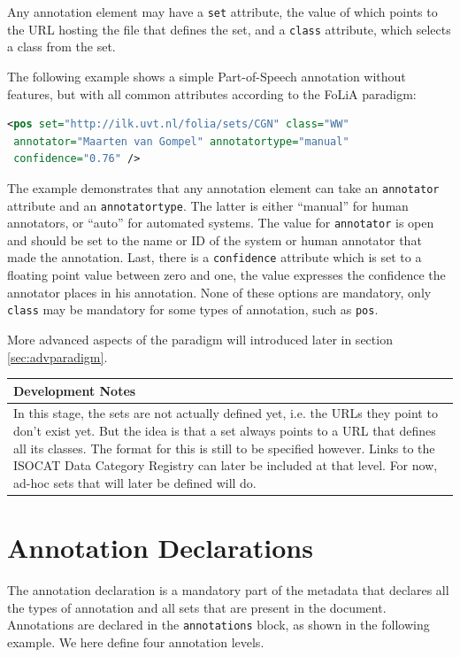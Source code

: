 \documentclass[a4paper,12pt]{report}
\newenvironment{devnotes}
{
\begin{center}
    \begin{tabular}[h!]{|p{0.8\textwidth}|}
    \hline
    {\bf Development Notes}\\\hline}
{   \\\hline
    \end{tabular}
\end{center}}
\begin{document}
Any annotation element may have a \texttt{set} attribute, the value of which points to the URL hosting the file that defines the set, and a \texttt{class} attribute, which selects a class from the set.

The following example shows a simple Part-of-Speech annotation without features, but with all common attributes according to the FoLiA paradigm:

\begin{lstlisting}[language=xml]
<pos set="http://ilk.uvt.nl/folia/sets/CGN" class="WW" 
 annotator="Maarten van Gompel" annotatortype="manual"
 confidence="0.76" />
\end{lstlisting}

The example demonstrates that any annotation element can take an \texttt{annotator} attribute and an \texttt{annotatortype}. The latter is either ``manual'' for human annotators, or ``auto'' for automated systems.  The value for \texttt{annotator} is open and should be set to the name or ID of the system or human annotator that made the annotation. Last, there is a \texttt{confidence} attribute which is set to a floating point value between zero and one, the value expresses the confidence the annotator places in his annotation. None of these options are mandatory, only \texttt{class} may be mandatory for some types of annotation, such as \texttt{pos}.

More advanced aspects of the paradigm will introduced later in section \ref{sec:advparadigm}.

\begin{devnotes}
In this stage, the sets are not actually defined yet, i.e. the URLs they point to don't exist yet. But the idea is that a set always points to a URL that defines all its classes. The format for this is still to be specified however. Links to the ISOCAT Data Category Registry can later be included at that level. For now, ad-hoc sets that will later be defined will do.
\end{devnotes}


\section{Annotation Declarations}


The annotation declaration is a mandatory part of the metadata that declares all the types of annotation and all sets that are present in the document. Annotations are declared in the \texttt{annotations} block, as shown in the following example. We here define four annotation levels.
\end{document}
